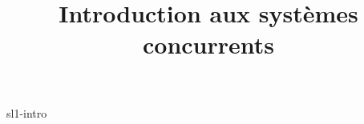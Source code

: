 \documentclass {beamer}
\title {Introduction aux systèmes concurrents}
\begin{document}
 {sl1-intro}
\end{document}

